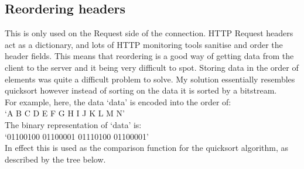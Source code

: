 \documentclass[12pt]{article}
\begin{document}
\subsection{Reordering headers}
This is only used on the Request side of the connection.
HTTP Request headers act as a dictionary, and lots of HTTP monitoring tools sanitise and order the header fields. This means that reordering is a good way of getting data from the client to the server and it being very difficult to spot.
Storing data in the order of elements was quite a difficult problem to solve. My solution essentially resembles quicksort however instead of sorting on the data it is sorted by a bitstream.\\
For example, here, the data `data' is encoded into the order of:\\
`A B C D E F G H I J K L M N'\\
The binary representation of `data' is:\\
`01100100 01100001 01110100 01100001'\\
In effect this is used as the comparison function for the quicksort algorithm, as described by the tree below.

\end{document}
